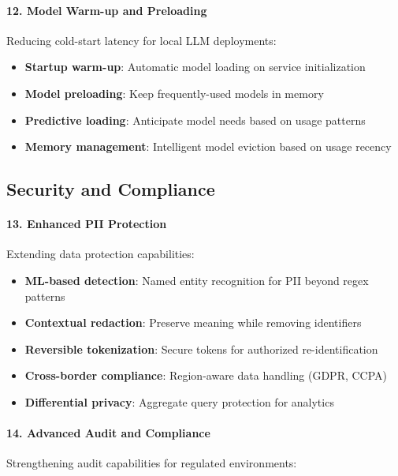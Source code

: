 \paragraph{12. Model Warm-up and Preloading}

Reducing cold-start latency for local LLM deployments:

\begin{itemize}
    \item \textbf{Startup warm-up}: Automatic model loading on service initialization
    \item \textbf{Model preloading}: Keep frequently-used models in memory
    \item \textbf{Predictive loading}: Anticipate model needs based on usage patterns
    \item \textbf{Memory management}: Intelligent model eviction based on usage recency
\end{itemize}

\subsection{Security and Compliance}

\paragraph{13. Enhanced PII Protection}

Extending data protection capabilities:

\begin{itemize}
    \item \textbf{ML-based detection}: Named entity recognition for PII beyond regex patterns
    \item \textbf{Contextual redaction}: Preserve meaning while removing identifiers
    \item \textbf{Reversible tokenization}: Secure tokens for authorized re-identification
    \item \textbf{Cross-border compliance}: Region-aware data handling (GDPR, CCPA)
    \item \textbf{Differential privacy}: Aggregate query protection for analytics
\end{itemize}

\paragraph{14. Advanced Audit and Compliance}

Strengthening audit capabilities for regulated environments:

